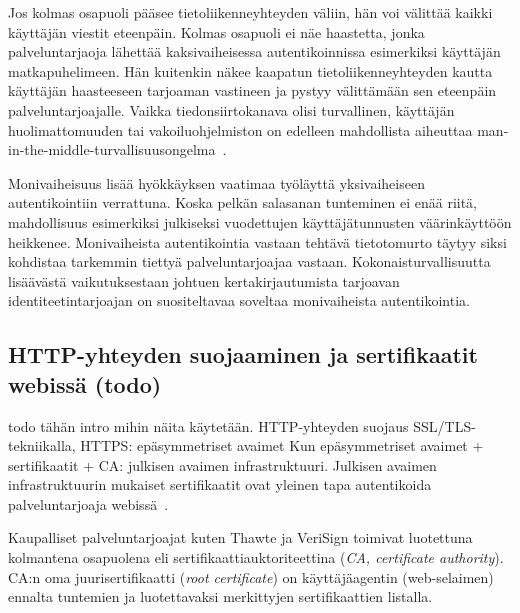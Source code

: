 \documentclass[finnish,gradu]{tktltiki}
\begin{document}
  Jos kolmas osapuoli pääsee tietoliikenneyhteyden väliin, hän voi välittää kaikki käyttäjän viestit eteenpäin. Kolmas osapuoli ei näe haastetta, jonka palveluntarjaoja lähettää kaksivaiheisessa autentikoinnissa esimerkiksi käyttäjän matkapuhelimeen. Hän kuitenkin näkee kaapatun tietoliikenneyhteyden kautta käyttäjän haasteeseen tarjoaman vastineen ja pystyy välittämään sen eteenpäin palveluntarjoajalle. Vaikka tiedonsiirtokanava olisi turvallinen, käyttäjän huolimattomuuden tai vakoiluohjelmiston on edelleen mahdollista aiheuttaa man-in-the-middle-turvallisuusongelma~\cite{schneier_2factor_2012}.

  Monivaiheisuus lisää hyökkäyksen vaatimaa työläyttä yksivaiheiseen autentikointiin verrattuna. Koska pelkän salasanan tunteminen ei enää riitä, mahdollisuus esimerkiksi julkiseksi vuodettujen käyttäjätunnusten väärinkäyttöön heikkenee. Monivaiheista autentikointia vastaan tehtävä tietotomurto täytyy siksi kohdistaa tarkemmin tiettyä palveluntarjoajaa vastaan. Kokonaisturvallisuutta lisäävästä vaikutuksestaan johtuen kertakirjautumista tarjoavan identiteetintarjoajan on suositeltavaa soveltaa monivaiheista autentikointia.




  \subsection{HTTP-yhteyden suojaaminen ja sertifikaatit webissä (todo)} %
  \label{sub:sertifikaatit_webissä}
  todo tähän intro mihin näita käytetään.
  HTTP-yhteyden suojaus SSL/TLS-tekniikalla, HTTPS: epäsymmetriset avaimet
  Kun epäsymmetriset avaimet + sertifikaatit + CA: julkisen avaimen infrastruktuuri.
  Julkisen avaimen infrastruktuurin mukaiset sertifikaatit ovat yleinen tapa autentikoida palveluntarjoaja webissä~\cite{id_in_federation_systems_2005}.

  Kaupalliset palveluntarjoajat kuten Thawte ja VeriSign toimivat luotettuna kolmantena osapuolena eli sertifikaattiauktoriteettina (\emph{CA, certificate authority}). CA:n oma juurisertifikaatti (\emph{root certificate}) on käyttäjäagentin (web-selaimen) ennalta tuntemien ja luotettavaksi merkittyjen sertifikaattien listalla.
\end{document}
